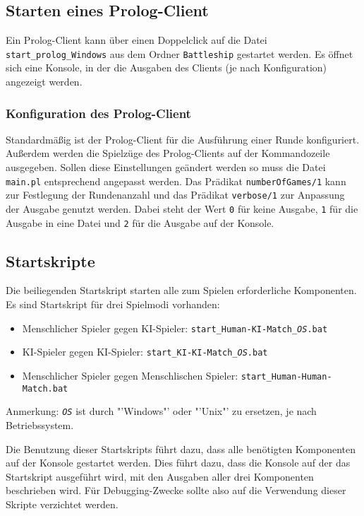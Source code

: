 \subsection{Starten eines Prolog-Client}
	Ein Prolog-Client kann über einen Doppelclick auf die Datei \texttt{start\_prolog\_Windows} aus dem Ordner 
	\texttt{Battleship} 
	gestartet werden. Es öffnet sich eine Konsole, in der die Ausgaben des Clients (je nach Konfiguration) angezeigt werden.
	
	\subsubsection {Konfiguration des Prolog-Client}
		Standardmäßig ist der Prolog-Client für die Ausführung einer Runde konfiguriert. Außerdem werden die Spielzüge des Prolog-Clients auf
		der Kommandozeile ausgegeben. Sollen diese Einstellungen geändert werden so muss die Datei \texttt{main.pl} entsprechend angepasst werden.
		Das Prädikat \texttt{numberOfGames/1} kann zur Festlegung der Rundenanzahl und das Prädikat \texttt{verbose/1} zur Anpassung der Ausgabe 
		genutzt werden. Dabei steht der Wert \texttt{0} für keine Ausgabe, \texttt{1} für die Ausgabe in eine Datei und \texttt{2} für 
		die Ausgabe auf der Konsole.
\subsection{Startskripte} %
\label{sub:startskripte}
	Die beiliegenden Startskript starten alle zum Spielen erforderliche Komponenten. Es sind Startskript für drei Spielmodi vorhanden:
	\begin{itemize}
		\item Menschlicher Spieler gegen KI-Spieler: \texttt{start\_Human-KI-Match\_\emph{OS}.bat}
		\item KI-Spieler gegen KI-Spieler: \texttt{start\_KI-KI-Match\_\emph{OS}.bat}
		\item Menschlicher Spieler gegen Menschlischen Spieler: \texttt{start\_Human-Human-Match.bat}
	\end{itemize}
	Anmerkung: \texttt{\emph{OS}} ist durch "'Windows"' oder "'Unix"' zu ersetzen, je nach Betriebssystem.
	
	Die Benutzung dieser Startskripts führt dazu, dass alle benötigten Komponenten auf der Konsole gestartet werden. Dies führt dazu, dass die Konsole 
	auf der das Startskript ausgeführt wird, mit den Ausgaben aller drei Komponenten beschrieben wird. Für Debugging-Zwecke sollte also auf die Verwendung dieser 
	Skripte verzichtet werden.
